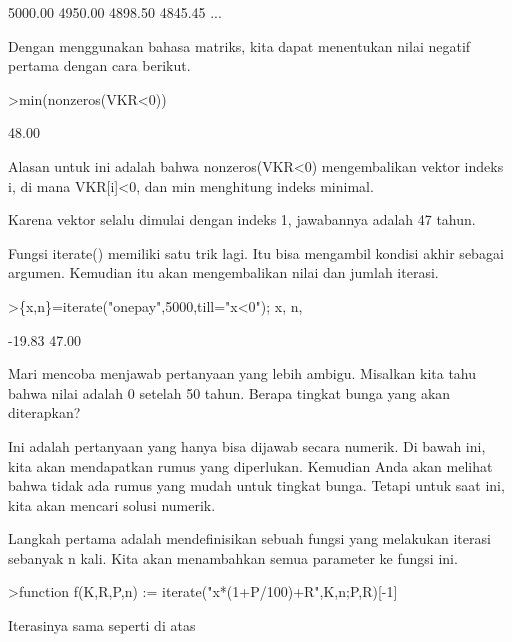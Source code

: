 \documentclass[12pt,arial,letterpaper]{book}
\begin{document}
\begin{eulercomment}
\begin{eulercomment}
\begin{eulercomment}
\begin{eulercomment}
\begin{eulercomment}
\begin{eulercomment}
\begin{eulercomment}
\begin{eulercomment}
\begin{eulercomment}
\begin{eulercomment}
\begin{eulercomment}
\begin{eulercomment}
\begin{euleroutput}
      5000.00     4950.00     4898.50     4845.45     ...
\end{euleroutput}
\begin{eulercomment}
Dengan menggunakan bahasa matriks, kita dapat menentukan nilai negatif
pertama dengan cara berikut.
\end{eulercomment}
\begin{eulerprompt}
>min(nonzeros(VKR<0))
\end{eulerprompt}
\begin{euleroutput}
        48.00 
\end{euleroutput}
\begin{eulercomment}
Alasan untuk ini adalah bahwa nonzeros(VKR\textless{}0) mengembalikan vektor
indeks i, di mana VKR[i]\textless{}0, dan min menghitung indeks minimal.

Karena vektor selalu dimulai dengan indeks 1, jawabannya adalah 47
tahun.

Fungsi iterate() memiliki satu trik lagi. Itu bisa mengambil kondisi
akhir sebagai argumen. Kemudian itu akan mengembalikan nilai dan
jumlah iterasi.
\end{eulercomment}
\begin{eulerprompt}
>\{x,n\}=iterate("onepay",5000,till="x<0"); x, n,
\end{eulerprompt}
\begin{euleroutput}
       -19.83 
        47.00 
\end{euleroutput}
\begin{eulercomment}
Mari mencoba menjawab pertanyaan yang lebih ambigu. Misalkan kita tahu
bahwa nilai adalah 0 setelah 50 tahun. Berapa tingkat bunga yang akan
diterapkan?

Ini adalah pertanyaan yang hanya bisa dijawab secara numerik. Di bawah
ini, kita akan mendapatkan rumus yang diperlukan. Kemudian Anda akan
melihat bahwa tidak ada rumus yang mudah untuk tingkat bunga. Tetapi
untuk saat ini, kita akan mencari solusi numerik.

Langkah pertama adalah mendefinisikan sebuah fungsi yang melakukan
iterasi sebanyak n kali. Kita akan menambahkan semua parameter ke
fungsi ini.
\end{eulercomment}
\begin{eulerprompt}
>function f(K,R,P,n) := iterate("x*(1+P/100)+R",K,n;P,R)[-1]
\end{eulerprompt}
\begin{eulercomment}
Iterasinya sama seperti di atas


\end{eulercomment}
\end{eulercomment}
\end{eulercomment}
\end{eulercomment}
\end{eulercomment}
\end{eulercomment}
\end{eulercomment}
\end{eulercomment}
\end{eulercomment}
\end{eulercomment}
\end{eulercomment}
\end{eulercomment}
\end{eulercomment}
\end{document}
